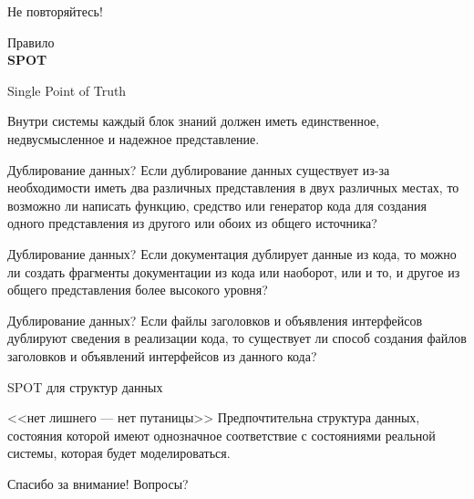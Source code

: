 \begin{frame}{Не повторяйтесь!}
	\begin{center}
	Правило\\
	{\Huge\bfseries SPOT}

	Single Point of Truth

	\end{center}
	\pause
	
	Внутри системы каждый блок знаний должен иметь единственное,  недвусмысленное и надежное представление.
\end{frame}

\begin{frame}{Дублирование данных?}
	Если дублирование данных существует из-за необходимости иметь два различных представления в 
	двух различных местах,  то возможно ли написать функцию,  средство или генератор кода для 
	создания одного представления из другого или обоих из общего источника?
\end{frame}

\begin{frame}{Дублирование данных?}
Если документация дублирует данные из кода,  то можно ли создать фрагменты документации 
из кода или наоборот,  или и то,  и другое из общего представления более высокого уровня?
\end{frame}

\begin{frame}{Дублирование данных?}
	Если файлы заголовков и объявления интерфейсов дублируют сведения в реализации кода,  
	то существует ли способ создания файлов заголовков и объявлений интерфейсов из данного кода?
\end{frame}

\begin{frame}{SPOT для структур данных}
	\begin{block}{<<нет лишнего — нет путаницы>>}
		Предпочтительна структура данных,  состояния которой имеют однозначное 
		соответствие с состояниями реальной системы,  которая будет моделироваться.
	\end{block}
\end{frame}


\begin{frame}{}
\Huge
\begin{center}
	Спасибо за внимание!
	\bigskip
	Вопросы?
\end{center}
\normalsize
\end{frame}



